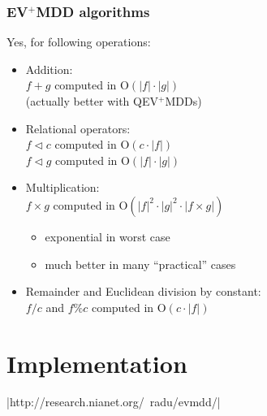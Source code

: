 \documentclass{beamer}
\renewcommand{\O}{\mathrm{O}}
\begin{document}
\begin{frame}
  \frametitle{EV$^+$MDD algorithms}
  Yes, for following operations:
  \begin{itemize}
  \item Addition:\\
    $f+g$ computed in $\O\left(|f|\cdot|g|\right)$ \\
    (actually better with QEV$^+$MDDs)
  \item Relational operators:\\
    $f \triangleleft c$ computed in $\O\left(c\cdot|f|\right)$ \\
    $f \triangleleft g$ computed in $\O\left(|f|\cdot|g|\right)$ \\
  \item Multiplication:\\
    $f\times g$ computed in $\O\left(|f|^2 \cdot |g|^2 \cdot |f\times g|\right)$
    \begin{itemize}
    \item exponential in worst case
    \item much better in many ``practical'' cases
    \end{itemize}
  \item Remainder and Euclidean division by constant:\\
    $f/c$ and $f\%c$ computed in $\O(c\cdot|f|)$
  \end{itemize}
\end{frame}

\section{Implementation}

\evmddurl|http://research.nianet.org/~radu/evmdd/|
\end{document}
